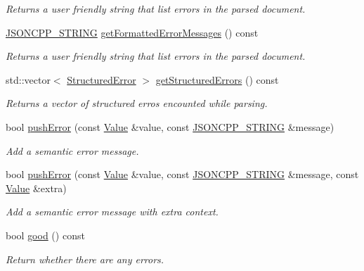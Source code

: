 \begin{DoxyCompactItemize}
\begin{DoxyCompactList}\small\item\em Returns a user friendly string that list errors in the parsed document. \end{DoxyCompactList}\item 
\hyperlink{json_8h_a1e723f95759de062585bc4a8fd3fa4be}{J\+S\+O\+N\+C\+P\+P\+\_\+\+S\+T\+R\+I\+NG} \hyperlink{class_json_1_1_reader_ae638a7b1f36f7ccf99ba89fa36ccf222}{get\+Formatted\+Error\+Messages} () const
\begin{DoxyCompactList}\small\item\em Returns a user friendly string that list errors in the parsed document. \end{DoxyCompactList}\item 
std\+::vector$<$ \hyperlink{struct_json_1_1_reader_1_1_structured_error}{Structured\+Error} $>$ \hyperlink{class_json_1_1_reader_ae3d714e95bd98b27e296c607e408189b}{get\+Structured\+Errors} () const
\begin{DoxyCompactList}\small\item\em Returns a vector of structured erros encounted while parsing. \end{DoxyCompactList}\item 
bool \hyperlink{class_json_1_1_reader_af5fa7099083f01706635ade1d0f8ddb5}{push\+Error} (const \hyperlink{class_json_1_1_value}{Value} \&value, const \hyperlink{json_8h_a1e723f95759de062585bc4a8fd3fa4be}{J\+S\+O\+N\+C\+P\+P\+\_\+\+S\+T\+R\+I\+NG} \&message)
\begin{DoxyCompactList}\small\item\em Add a semantic error message. \end{DoxyCompactList}\item 
bool \hyperlink{class_json_1_1_reader_a3568be9db568ff57bd3fcc373143dff3}{push\+Error} (const \hyperlink{class_json_1_1_value}{Value} \&value, const \hyperlink{json_8h_a1e723f95759de062585bc4a8fd3fa4be}{J\+S\+O\+N\+C\+P\+P\+\_\+\+S\+T\+R\+I\+NG} \&message, const \hyperlink{class_json_1_1_value}{Value} \&extra)
\begin{DoxyCompactList}\small\item\em Add a semantic error message with extra context. \end{DoxyCompactList}\item 
bool \hyperlink{class_json_1_1_reader_a86cbb42b3e6d4a4d6416473b1a8f6ae7}{good} () const
\begin{DoxyCompactList}\small\item\em Return whether there are any errors. \end{DoxyCompactList}\end{DoxyCompactItemize}
